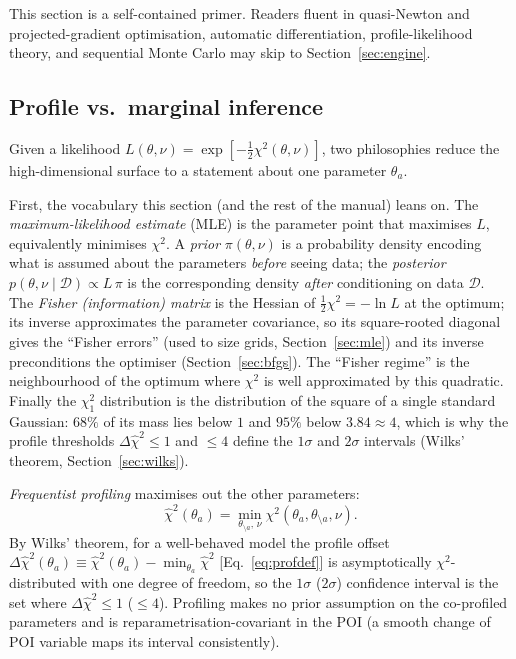 \documentclass[11pt]{article}
\newcommand{\chisq}{\chi^2}
\newcommand{\dchisq}{\Delta\hat\chi^2}
\begin{document}
This section is a self-contained primer. Readers fluent in quasi-Newton
and projected-gradient optimisation, automatic differentiation,
profile-likelihood theory, and sequential Monte Carlo may skip to
Section~\ref{sec:engine}.

\subsection{Profile vs.\ marginal inference}
\label{sec:profvsmarg}

Given a likelihood $L(\theta,\nu)=\exp[-\tfrac12\chisq(\theta,\nu)]$, two
philosophies reduce the high-dimensional surface to a statement about one
parameter $\theta_a$.

First, the vocabulary this section (and the rest of the manual) leans on.
The \emph{maximum-likelihood estimate} (MLE) is the parameter point that
maximises $L$, equivalently minimises $\chisq$. A \emph{prior}
$\pi(\theta,\nu)$ is a probability density encoding what is assumed about
the parameters \emph{before} seeing data; the \emph{posterior}
$p(\theta,\nu\mid\mathcal D)\propto L\,\pi$ is the corresponding density
\emph{after} conditioning on data $\mathcal D$. The \emph{Fisher
(information) matrix} is the Hessian of $\tfrac12\chisq=-\ln L$ at the
optimum; its inverse approximates the parameter covariance, so its
square-rooted diagonal gives the ``Fisher errors'' (used to size grids,
Section~\ref{sec:mle}) and its inverse preconditions the optimiser
(Section~\ref{sec:bfgs}). The ``Fisher regime'' is the neighbourhood of the
optimum where $\chisq$ is well approximated by this quadratic. Finally the
$\chisq_1$ distribution is the distribution of the square of a single
standard Gaussian: $68\%$ of its mass lies below $1$ and $95\%$ below
$3.84\approx4$, which is why the profile thresholds $\dchisq\le1$ and
$\le4$ define the $1\sigma$ and $2\sigma$ intervals
(Wilks' theorem, Section~\ref{sec:wilks}).

\emph{Frequentist profiling} maximises out the other parameters:
\begin{equation}
\hat\chisq(\theta_a)=\min_{\theta_{\setminus a},\,\nu}
\chisq(\theta_a,\theta_{\setminus a},\nu).
\label{eq:profdef}
\end{equation}
By Wilks' theorem, for a well-behaved model the profile offset
$\dchisq(\theta_a)\equiv\hat\chisq(\theta_a)-\min_{\theta_a}\hat\chisq$
[Eq.~\eqref{eq:profdef}] is asymptotically $\chisq$-distributed with one
degree of freedom, so the $1\sigma$ ($2\sigma$) confidence interval is the
set where $\dchisq\le1$ ($\le4$). Profiling makes no prior assumption on
the co-profiled parameters and is reparametrisation-covariant in the POI
(a smooth change of POI variable maps its interval consistently).
\end{document}
